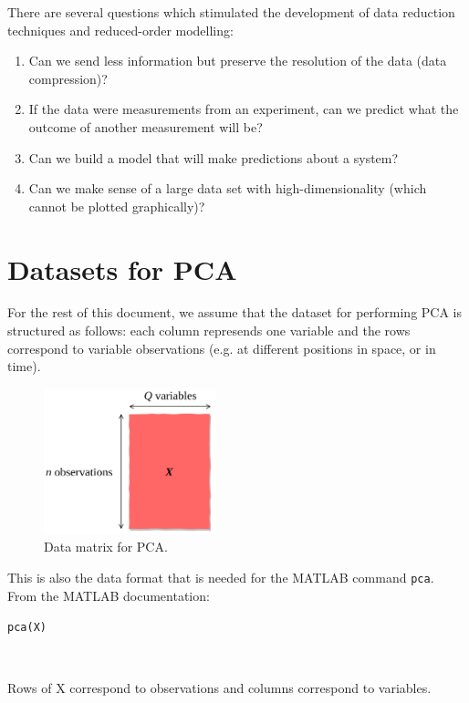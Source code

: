 \documentclass[10pt,twocolumn]{article}
\begin{document}
There are several questions which stimulated the development of data reduction techniques and reduced-order modelling:

\begin{enumerate}
\item Can we send less information but preserve the resolution of the data (data compression)?

\item If the data were measurements from an experiment, can we predict what the outcome of another measurement will be?

\item Can we build a model that will make predictions about a system?

\item Can we make sense of a large data set with high-dimensionality (which cannot be plotted graphically)?
\end{enumerate}

\section{Datasets for PCA}

For the rest of this document, we assume that the dataset for performing PCA is structured as follows: each column represends one variable and the rows correspond to variable observations (e.g. at different positions in space, or in time).

\begin{figure}[H]
\centering\includegraphics[width=5cm]{data-set-PCA.png}
\caption{Data matrix for PCA.}
\label{fig:data-matrix}
\end{figure}

This is also the data format that is needed for the MATLAB command \texttt{pca}. From the MATLAB documentation:


\begin{framed}
\texttt{pca(X)}

\,\,

Rows of X correspond to observations and columns correspond to variables.
\end{framed}
\end{document}
